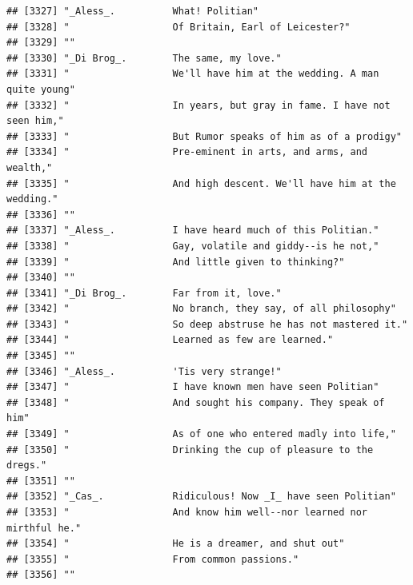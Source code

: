 \documentclass{article}\usepackage[]{graphicx}\usepackage[]{color}
\makeatletter
\newenvironment{kframe}{%
 \def\at@end@of@kframe{}%
 \ifinner\ifhmode%
  \def\at@end@of@kframe{\end{minipage}}%
  \begin{minipage}{\columnwidth}%
 \fi\fi%
 \def\FrameCommand##1{\hskip\@totalleftmargin \hskip-\fboxsep
 \colorbox{shadecolor}{##1}\hskip-\fboxsep
     \hskip-\linewidth \hskip-\@totalleftmargin \hskip\columnwidth}%
 \MakeFramed {\advance\hsize-\width
   \@totalleftmargin\z@ \linewidth\hsize
   \@setminipage}}%
 {\par\unskip\endMakeFramed%
 \at@end@of@kframe}
\newenvironment{knitrout}{}{} %
\makeatother
\begin{document}
\begin{knitrout}
\begin{kframe}
\begin{verbatim}
## [3327] "_Aless_.          What! Politian"                                            
## [3328] "                  Of Britain, Earl of Leicester?"                            
## [3329] ""                                                                            
## [3330] "_Di Brog_.        The same, my love."                                        
## [3331] "                  We'll have him at the wedding. A man quite young"          
## [3332] "                  In years, but gray in fame. I have not seen him,"          
## [3333] "                  But Rumor speaks of him as of a prodigy"                   
## [3334] "                  Pre-eminent in arts, and arms, and wealth,"                
## [3335] "                  And high descent. We'll have him at the wedding."          
## [3336] ""                                                                            
## [3337] "_Aless_.          I have heard much of this Politian."                       
## [3338] "                  Gay, volatile and giddy--is he not,"                       
## [3339] "                  And little given to thinking?"                             
## [3340] ""                                                                            
## [3341] "_Di Brog_.        Far from it, love."                                        
## [3342] "                  No branch, they say, of all philosophy"                    
## [3343] "                  So deep abstruse he has not mastered it."                  
## [3344] "                  Learned as few are learned."                               
## [3345] ""                                                                            
## [3346] "_Aless_.          'Tis very strange!"                                        
## [3347] "                  I have known men have seen Politian"                       
## [3348] "                  And sought his company. They speak of him"                 
## [3349] "                  As of one who entered madly into life,"                    
## [3350] "                  Drinking the cup of pleasure to the dregs."                
## [3351] ""                                                                            
## [3352] "_Cas_.            Ridiculous! Now _I_ have seen Politian"                    
## [3353] "                  And know him well--nor learned nor mirthful he."           
## [3354] "                  He is a dreamer, and shut out"                             
## [3355] "                  From common passions."                                     
## [3356] ""                                                                            

\end{verbatim}
\end{kframe}
\end{knitrout}
\end{document}
